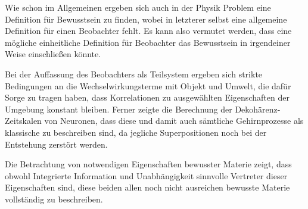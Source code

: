 
Wie schon im Allgemeinen ergeben sich auch in der Physik Problem eine Definition für Bewusstsein zu finden,
wobei in letzterer selbst eine allgemeine Definition für einen Beobachter fehlt. Es kann also vermutet werden,
dass eine mögliche einheitliche Definition für Beobachter das Bewusstsein in irgendeiner Weise einschließen 
könnte.

Bei der Auffassung des Beobachters als Teilsystem ergeben sich strikte Bedingungen an die Wechselwirkungsterme
mit Objekt und Umwelt, die dafür Sorge zu tragen haben, dass Korrelationen zu ausgewählten Eigenschaften der
Umgebung konstant bleiben. 
Ferner zeigte die Berechnung der Dekohärenz-Zeitskalen von Neuronen, dass diese und damit auch sämtliche Gehirnprozesse
als klassische zu beschreiben sind, da jegliche Superpositionen noch bei der Entstehung zerstört werden.

Die Betrachtung von notwendigen Eigenschaften bewusster Materie zeigt, dass obwohl Integrierte Information
und Unabhängigkeit sinnvolle Vertreter dieser Eigenschaften sind, diese beiden allen noch nicht ausreichen bewusste Materie vollständig zu beschreiben. 


